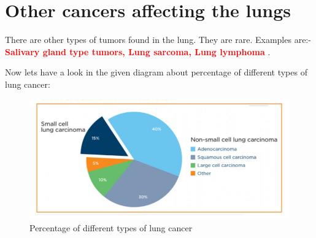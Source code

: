 \section{Other cancers affecting the lungs} 
\begin{remark}
There are other types of tumors found in the lung. They are rare. Examples are:- \textcolor{red}{\textbf{Salivary gland type tumors, Lung sarcoma, Lung lymphoma }}.
\end{remark}

Now lets have a look in the given diagram about percentage of different types of lung cancer:

\begin{figure}[h!]
    \centering
    \includegraphics[width=0.7\linewidth]{images/percentage_of_lc.jpeg}
    \caption{Percentage of different types of lung cancer}
    \label{fig:types-label}
\end{figure}
